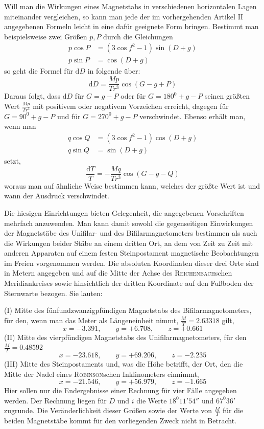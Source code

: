 Will man die Wirkungen eines Magnetstabs in verschiedenen horizontalen Lagen miteinander vergleichen, so kann man jede der im vorhergehenden Artikel II angegebenen Formeln leicht in eine dafür geeignete Form bringen. Bestimmt man beispielsweise zwei Größen $p,P$ durch die Gleichungen
\[
\begin{aligned}
p\cos P&=(3\cos f^2-1)\sin(D+g)\\
p\sin P&=\cos(D+g)
\end{aligned}
\]
so geht die Formel für $\mathrm{d}D$ in folgende über:
\[
\mathrm{d}D=\frac{Mp}{Tr^3}\cos(G-g+P)
\]
Daraus folgt, dass $\mathrm{d}D$ für $G=g-P$ oder für $G=180^0+g-P$ seinen größten Wert $\frac{Mp}{Tr^3}$ mit positivem oder negativem Vorzeichen erreicht, dagegen für $G=90^0+g-P$ und für $G=270^0+g-P$ verschwindet. Ebenso erhält man, wenn man
\[
\begin{aligned}
q\cos Q&=(3\cos f^2-1)\cos(D+g)\\
q\sin Q&=\sin(D+g)
\end{aligned}
\]
setzt,
\[
\frac{\mathrm{d}T}{T}=-\frac{Mq}{Tr^3}\cos(G-g-Q)
\]
woraus man auf ähnliche Weise bestimmen kann, welches der größte Wert ist und wann der Ausdruck verschwindet.

Die hiesigen Einrichtungen bieten Gelegenheit, die angegebenen Vorschriften mehrfach anzuwenden. Man kann damit sowohl die gegenseitigen Einwirkungen der Magnetstäbe des Unifilar- und des Bifilarmagnetometers bestimmen als auch die Wirkungen beider Stäbe an einem dritten Ort, an dem von Zeit zu Zeit mit anderen Apparaten auf einem festen Steinpostament magnetische Beobachtungen im Freien vorgenommen werden. Die absoluten Koordinaten dieser drei Orte sind in Metern angegeben und auf die Mitte
der Achse des \textsc{Reichenbach}schen Meridiankreises sowie hinsichtlich der dritten Koordinate auf den Fußboden der Sternwarte bezogen. Sie lauten:

(I) Mitte des fünfundzwanzigpfündigen Magnetstabs des Bifilarmagnetometers, für den, wenn man das Meter als Längeneinheit nimmt, $\frac{M}{T}=2.63318$ gilt,
\[
x=-3.391,\qquad y=+6.708,\qquad z=+0.661
\]
(II) Mitte des vierpfündigen Magnetstabs des Unifilarmagnetometers, für den $\frac{M}{T}=0.48592$
\[
x=-23.618,\qquad y=+69.206,\qquad z=-2.235
\]
(III) Mitte des Steinpostaments und, was die Höhe betrifft, der Ort, den die Mitte der Nadel eines \textsc{Robinson}schen Inklinometers einnimmt,
\[
x=-21.546,\qquad y=+56.979,\qquad z=-1.665
\]
Hier sollen nur die Endergebnisse einer Rechnung für vier Fälle angegeben werden. Der Rechnung liegen für $D$ und $i$ die Werte $18^0 11'54''$ und $67^0 36'$ zugrunde. Die Veränderlichkeit dieser Größen sowie der Werte von $\frac{M}{T}$ für die beiden Magnetstäbe kommt für den vorliegenden Zweck nicht in Betracht.

